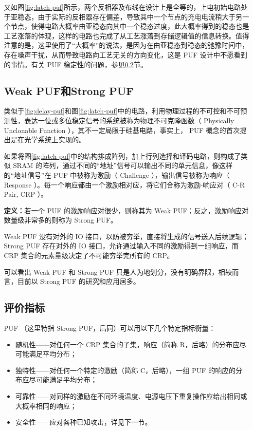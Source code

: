 又如图\ref{fig:latch-puf}所示，两个反相器及布线在设计上是全等的，上电初始电路处于亚稳态，由于实际的反相器存在偏差，导致其中一个节点的充电电流稍大于另一个节点，使得电路大概率由亚稳态向其中一个稳态过度，此大概率得到的稳态也是工艺涨落的体现，这样的电路也完成了从工艺涨落到存储逻辑值的信息转换。值得注意的是，这里使用了``大概率''的说法，是因为在由亚稳态到稳态的弛豫时间中，存在噪声干扰，从而导致电路向工艺无关的方向变化，这是 PUF 设计中不愿看到的事情。有关 PUF 稳定性的问题，参见\ref{subsec:metrics}节。

\subsection{Weak PUF和Strong PUF}
类似于\ref{fig:delay-puf}和图\ref{fig:latch-puf}中的电路，利用物理过程的不可控和不可预测性，表达一位或多位稳定信号的系统被称为物理不可克隆函数（ Physically Unclonable Function ），其不一定局限于硅基电路，事实上， PUF 概念的首次提出是在光学系统上实现的\supercite{pappu2002physical}。

如果将图\ref{fig:latch-puf}中的结构排成阵列，加上行列选择和译码电路，则构成了类似 SRAM 的阵列，通过不同的``地址''信号可以输出不同的单元信息，像这样的``地址信号''在 PUF 中被称为激励（ Challenge ），输出信号被称为响应（ Response ）。每一个响应都由一个激励相对应，将它们合称为激励-响应对（ C-R Pair, CRP ）。

\textbf{定义：}若一个 PUF 的激励响应对很少，则称其为 Weak PUF；反之，激励响应对数量级非常多的则称为 Strong PUF\supercite{ruhrmair2014pufs}。

Weak PUF 没有对外的 IO 接口，以防被穷举，直接将生成的信号送入后续逻辑； Strong PUF 存在对外的 IO 接口，允许通过输入不同的激励得到一组响应，而 CRP 集合的元素量级决定了不可能穷举完所有的 CRP。

可以看出 Weak PUF 和 Strong PUF 只是人为地划分，没有明确界限，相较而言，目前以 Strong PUF 的研究和应用居多\supercite{rostami2014quo}。

\subsection{评价指标}\label{subsec:metrics}
PUF （这里特指 Strong PUF，后同）可以用以下几个特定指标衡量：
\begin{itemize}
\item 随机性——对任何一个 CRP 集合的子集，响应（简称 R，后略）的分布应尽可能满足平均分布；
\item 独特性——对任何一个特定的激励（简称 C，后略），一组 PUF 的响应的分布应尽可能满足平均分布；
\item 可靠性——对同样的激励在不同环境温度、电源电压下重复操作应给出相同或大概率相同的响应；
\item 安全性——应对各种已知攻击，详见下一节。
\end{itemize}

